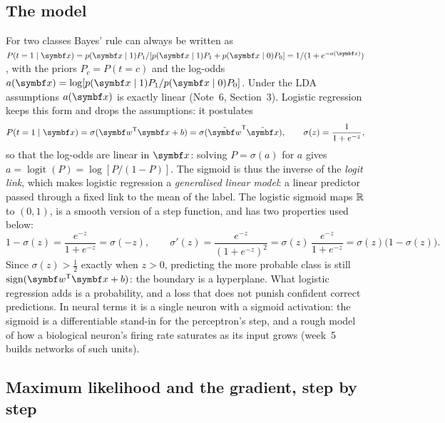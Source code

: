 \documentclass[11pt]{article}
\newcommand{\w}{\vect{w}}
\newcommand{\xt}{\tilde{\x}}
\newcommand{\wt}{\tilde{\w}}
\newcommand{\sign}{\operatorname{sign}}
\begin{document}
\subsection{The model}

For two classes Bayes' rule can always be written as $P(t = 1 \mid \x) = p(\x \mid 1)P_1 / [p(\x \mid 1)P_1 +
p(\x \mid 0)P_0] = 1/(1 + e^{-a(\x)})$, with the priors $P_c = P(t = c)$ and the log-odds $a(\x) = \log[p(\x \mid
1)P_1/p(\x \mid 0)P_0]$. Under the LDA
assumptions $a(\x)$ is exactly linear (Note~6, Section~3). Logistic regression keeps this form and drops the assumptions:
it postulates
\[
  P(t = 1 \mid \x) = \sigma(\w\T\x + b) = \sigma(\wt\T\xt), \qquad \sigma(z) = \frac{1}{1 + e^{-z}} ,
\]
so that the log-odds are linear in $\x$: solving $P = \sigma(a)$ for $a$ gives $a = \operatorname{logit}(P) = \log[P/(1 -
P)]$. The sigmoid is thus the inverse of the \emph{logit link}, which makes logistic regression a \emph{generalised linear
model}: a linear predictor passed through a fixed link to the mean of the label. The logistic sigmoid maps $\mathbb{R}$ to $(0, 1)$, is a smooth version of a step function, and has two properties used below:
\[
  1 - \sigma(z) = \frac{e^{-z}}{1 + e^{-z}} = \sigma(-z), \qquad
  \sigma'(z) = \frac{e^{-z}}{(1 + e^{-z})^2} = \sigma(z)\,\frac{e^{-z}}{1 + e^{-z}} = \sigma(z)\big(1 - \sigma(z)\big) .
\]
Since $\sigma(z) > \frac12$ exactly when $z > 0$, predicting the more probable class is still $\sign(\w\T\x + b)$: the
boundary is a hyperplane. What logistic regression adds is a probability, and a loss that does not punish confident
correct predictions. In neural terms it is a single neuron with a sigmoid activation: the sigmoid is a differentiable
stand-in for the perceptron's step, and a rough model of how a biological neuron's firing rate saturates as its input
grows (week~5 builds networks of such units).

\subsection{Maximum likelihood and the gradient, step by step}
\end{document}
